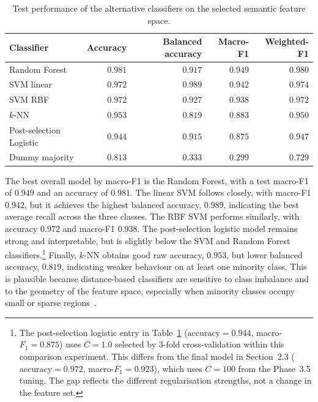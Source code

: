 \documentclass{ipgpmaster}
\begin{document}
\begin{table}[H]
\centering
\small
\begin{tabular}{lrrrr}
\hline
\textbf{Classifier} & \textbf{Accuracy} & \textbf{Balanced accuracy} & \textbf{Macro-F1} & \textbf{Weighted-F1} \\
\hline
Random Forest & \(0.981\) & \(0.917\) & \(0.949\) & \(0.980\) \\
SVM linear & \(0.972\) & \(0.989\) & \(0.942\) & \(0.974\) \\
SVM RBF & \(0.972\) & \(0.927\) & \(0.938\) & \(0.972\) \\
\(k\)-NN & \(0.953\) & \(0.819\) & \(0.883\) & \(0.950\) \\
Post-selection Logistic\footnotemark & \(0.944\) & \(0.915\) & \(0.875\) & \(0.947\) \\
Dummy majority & \(0.813\) & \(0.333\) & \(0.299\) & \(0.729\) \\
\hline
\end{tabular}
\caption{Test performance of the alternative classifiers on the selected semantic feature space.}
\label{tab:alternative-classifiers-results}
\end{table}

The best overall model by macro-F1 is the Random Forest, with a test macro-F1 of \(0.949\) and an accuracy of \(0.981\). The linear SVM follows closely, with macro-F1 \(0.942\), but it achieves the highest balanced accuracy, \(0.989\), indicating the best average recall across the three classes. The RBF SVM performs similarly, with accuracy \(0.972\) and macro-F1 \(0.938\). The post-selection logistic model remains strong and interpretable, but is slightly below the SVM and Random Forest classifiers.\footnote{The
post-selection logistic entry in Table~\ref{tab:alternative-classifiers-results}
($\text{accuracy} = 0.944$, macro-$F_1 = 0.875$) uses $C = 1.0$
selected by 3-fold cross-validation within this comparison experiment.
This differs from the final model in Section~2.3 ($\text{accuracy} =
0.972$, macro-$F_1 = 0.923$), which uses $C = 100$ from the Phase~3.5
tuning. The gap reflects the different regularisation strengths, not a
change in the feature set.} Finally, \(k\)-NN obtains good raw accuracy, \(0.953\), but lower balanced accuracy, \(0.819\), indicating weaker behaviour on at least one minority class. This is plausible because distance-based classifiers are sensitive to class imbalance and to the geometry of the feature space, especially when minority classes occupy small or sparse regions~\cite{cover1967nearest,he2009learning}.
\end{document}
